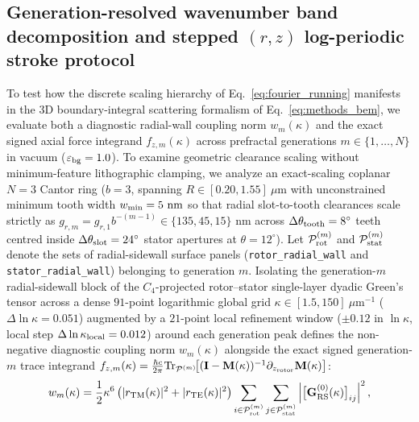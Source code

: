 \documentclass[pdflatex,sn-nature]{sn-jnl}
\begin{document}
\subsection*{Generation-resolved wavenumber band decomposition and stepped $(r,z)$ log-periodic stroke protocol}
To test how the discrete scaling hierarchy of Eq.~\eqref{eq:fourier_running} manifests in the 3D boundary-integral scattering formalism of Eq.~\eqref{eq:methods_bem}, we evaluate both a diagnostic radial-wall coupling norm $w_m(\kappa)$ and the exact signed axial force integrand $f_{z,m}(\kappa)$ across prefractal generations $m \in \{1, \dots, N\}$ in vacuum ($\varepsilon_{\rm bg}=1.0$). To examine geometric clearance scaling without minimum-feature lithographic clamping, we analyze an exact-scaling coplanar $N=3$ Cantor ring ($b=3$, spanning $R \in [0.20, 1.55]\ \mu\text{m}$ with unconstrained minimum tooth width $w_{\rm min} = 5\text{ nm}$ so that radial slot-to-tooth clearances scale strictly as $g_{r,m} = g_{r,1} b^{-(m-1)} \in \{135, 45, 15\}\text{ nm}$ across $\Delta\theta_{\rm tooth} = 8^\circ$ teeth centred inside $\Delta\theta_{\rm slot} = 24^\circ$ stator apertures at $\theta = 12^\circ$). Let $\mathcal{P}_{\rm rot}^{(m)}$ and $\mathcal{P}_{\rm stat}^{(m)}$ denote the sets of radial-sidewall surface panels (\texttt{rotor\_radial\_wall} and \texttt{stator\_radial\_wall}) belonging to generation $m$. Isolating the generation-$m$ radial-sidewall block of the $C_4$-projected rotor--stator single-layer dyadic Green's tensor across a dense $91$-point logarithmic global grid $\kappa \in [1.5, 150]\ \mu\text{m}^{-1}$ ($\Delta\ln\kappa = 0.051$) augmented by a $21$-point local refinement window ($\pm 0.12$ in $\ln\kappa$, local step $\Delta\ln\kappa_{\rm local} = 0.012$) around each generation peak defines the non-negative diagnostic coupling norm $w_m(\kappa)$ alongside the exact signed generation-$m$ trace integrand $f_{z,m}(\kappa) = \frac{\hbar c}{2\pi}\mathrm{Tr}_{\mathcal{P}^{(m)}}\!\bigl[(\mathbf{I}-\mathbf{M}(\kappa))^{-1}\partial_{z_{\rm rotor}}\mathbf{M}(\kappa)\bigr]$:
\begin{equation}
w_m(\kappa) = \frac{1}{2}\kappa^6 \left( |r_{\rm TM}(\kappa)|^2 + |r_{\rm TE}(\kappa)|^2 \right) \sum_{i \in \mathcal{P}_{\rm rot}^{(m)}} \sum_{j \in \mathcal{P}_{\rm stat}^{(m)}} \left| \bigl[\mathbf{G}_{\rm RS}^{(0)}(\kappa)\bigr]_{ij} \right|^2,
\label{eq:methods_spectral_subband}
\end{equation}
\end{document}

